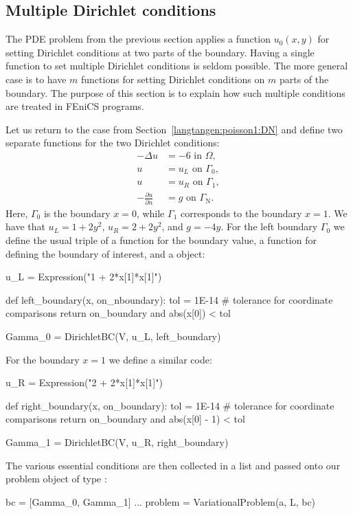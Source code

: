 \subsection{Multiple Dirichlet conditions}
\label{langtangen:poisson:multiple:Dirichlet}

The PDE problem from the previous section applies a function $u_0(x,y)$
for setting Dirichlet conditions at two parts of the boundary.
Having a single function to set multiple Dirichlet conditions is seldom
possible. The more general case is to have $m$ functions for setting
Dirichlet conditions on $m$ parts of the boundary. The purpose of this
section is to explain how such multiple conditions are treated in FEniCS
programs.

Let us return to the case from Section~\ref{langtangen:poisson1:DN}
and define two separate functions for the two Dirichlet conditions:
\begin{align}
  - \Delta u &= -6 \mbox{ in } \Omega,
\\
  u &= u_L \mbox{ on } \Gamma_0,
\\
  u &= u_R \mbox{ on } \Gamma_1,
\\
  - \frac{\partial u}{\partial n} &= g \mbox{ on } \Gamma_{\mathrm{N}}.
\end{align}
Here, $\Gamma_0$ is the boundary $x=0$, while $\Gamma_1$ corresponds to
the boundary $x=1$.  We have that $u_L = 1 + 2y^2$, $u_R = 2 + 2y^2$,
and $g=-4y$.  For the left boundary $\Gamma_0$ we define the usual
triple of a function for the boundary value, a function for defining
the boundary of interest, and a  object:
\begin{python}
u_L = Expression("1 + 2*x[1]*x[1]")

def left_boundary(x, on_nboundary):
    tol = 1E-14   # tolerance for coordinate comparisons
    return on_boundary and abs(x[0]) < tol

Gamma_0 = DirichletBC(V, u_L, left_boundary)
\end{python}

For the boundary $x=1$ we define a similar code:
\begin{python}
u_R = Expression("2 + 2*x[1]*x[1]")

def right_boundary(x, on_boundary):
    tol = 1E-14   # tolerance for coordinate comparisons
    return on_boundary and abs(x[0] - 1) < tol

Gamma_1 = DirichletBC(V, u_R, right_boundary)
\end{python}
The various essential conditions are then collected in a list and passed
onto our problem object of type :
\begin{python}
bc = [Gamma_0, Gamma_1]
...
problem = VariationalProblem(a, L, bc)
\end{python}

